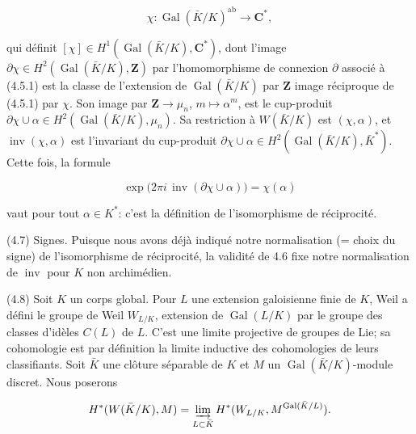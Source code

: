 \documentclass[9pt,twoside]{extarticle}
\begin{document}
{\[
\chi:\operatorname{Gal}(\bar K/K)^{\mathrm{ab}}\longrightarrow\mathbf C^*,
\]

qui définit \([\chi]\in H^1(\operatorname{Gal}(\bar K/K),\mathbf C^*)\), dont l’image \(\partial\chi\in H^2(\operatorname{Gal}(\bar K/K),\mathbf Z)\) par l’homomorphisme de connexion \(\partial\) associé à (4.5.1) est la classe de l’extension de \(\operatorname{Gal}(\bar K/K)\) par \(\mathbf Z\) image réciproque de (4.5.1) par \(\chi\). Son image par \(\mathbf Z\to\mu_n\), \(m\mapsto\alpha^m\), est le cup-produit \(\partial\chi\cup\alpha\in H^2(\operatorname{Gal}(\bar K/K),\mu_n)\). Sa restriction à \(W(\bar K/K)\) est \((\chi,\alpha)\), et \(\operatorname{inv}(\chi,\alpha)\) est l’invariant du cup-produit \(\partial\chi\cup\alpha\in H^2(\operatorname{Gal}(\bar K/K),\bar K^*)\). Cette fois, la formule\par

\[
\exp\bigl(2\pi i\,\operatorname{inv}(\partial\chi\cup\alpha)\bigr)=\chi(\alpha)
\]

vaut pour tout \(\alpha\in K^*\): c’est la définition de l’isomorphisme de réciprocité.\par

(4.7) Signes. Puisque nous avons déjà indiqué notre normalisation (= choix du signe) de l’isomorphisme de réciprocité, la validité de 4.6 fixe notre normalisation de \(\operatorname{inv}\) pour \(K\) non archimédien.\par

(4.8) Soit \(K\) un corps global. Pour \(L\) une extension galoisienne finie de \(K\), Weil a défini le groupe de Weil \(W_{L/K}\), extension de \(\operatorname{Gal}(L/K)\) par le groupe des classes d’idèles \(C(L)\) de \(L\). C’est une limite projective de groupes de Lie; sa cohomologie est par définition la limite inductive des cohomologies de leurs classifiants. Soit \(\bar K\) une clôture séparable de \(K\) et \(M\) un \(\operatorname{Gal}(\bar K/K)\)-module discret. Nous poserons\par

\[
H^*(W(\bar K/K),M)=\varinjlim_{L\subset\bar K}H^*(W_{L/K},M^{\operatorname{Gal}(\bar K/L)}).
\]
}
\end{document}
